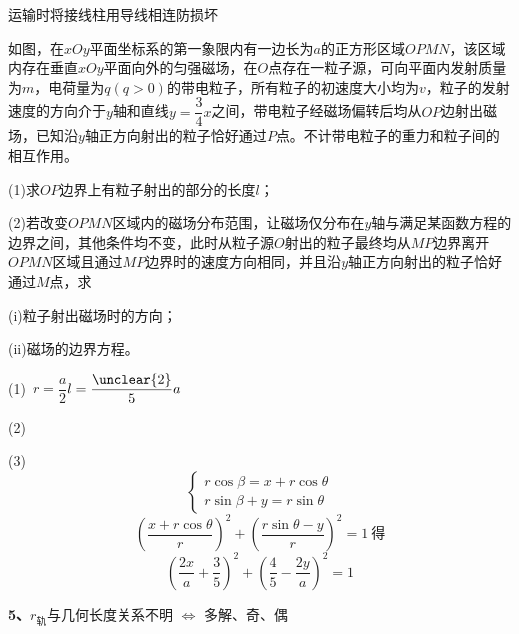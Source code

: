 运输时将接线柱用导线相连防损坏 %
\begin{problem}[25.（19分）]
如图，在$xOy$平面坐标系的第一象限内有一边长为$a$的正方形区域$OPMN$，该区域内存在垂直$xOy$平面向外的匀强磁场，在$O$点存在一粒子源，可向平面内发射质量为$m$，电荷量为$q(q>0)$的带电粒子，所有粒子的初速度大小均为$v$，粒子的发射速度的方向介于$y$轴和直线$y=\dfrac34x$之间，带电粒子经磁场偏转后均从$OP$边射出磁场，已知沿$y$轴正方向射出的粒子恰好通过$P$点。不计带电粒子的重力和粒子间的相互作用。

(1)求$OP$边界上有粒子射出的部分的长度$l$；

(2)若改变$OPMN$区域内的磁场分布范围，让磁场仅分布在$y$轴与满足某函数方程的边界之间，其他条件均不变，此时从粒子源$O$射出的粒子最终均从$MP$边界离开$OPMN$区域且通过$MP$边界时的速度方向相同，并且沿$y$轴正方向射出的粒子恰好通过$M$点，求

(i)粒子射出磁场时的方向；

(ii)磁场的边界方程。

\begin{solution}
(1)\ $r=\dfrac{a}{2}$\quad {}\quad $l=\dfrac{\unclear{2}}{5}a$

(2)\ \red{$\theta=2\alpha$}




(3)
{\color{red!75!black}
\[
\begin{cases}
r\cos\beta=x+r\cos\theta\\
r\sin\beta+y=r\sin\theta
\end{cases}
\]
\[
\left(\frac{x+r\cos\theta}{r}\right)^{2}+\left(\frac{r\sin\theta-y}{r}\right)^{2}=1\ \text{得}
\]
\[
\left(\frac{2x}{a}+\frac35\right)^{2}+\left(\frac45-\frac{2y}{a}\right)^{2}=1
\]
}
\end{solution}
\end{problem}
\textbf{5、}$r_{\text{轨}}$与几何长度关系不明 $\Leftrightarrow$ 多解、奇、偶

